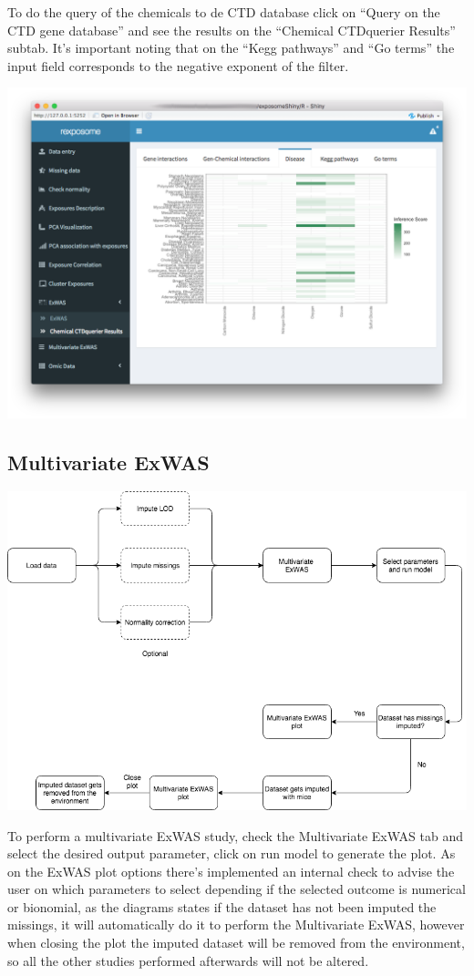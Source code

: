 \documentclass[
]{book}
\begin{document}
To do the query of the chemicals to de CTD database click on ``Query on the CTD gene database'' and see the results on the ``Chemical CTDquerier Results'' subtab. It's important noting that on the ``Kegg pathways'' and ``Go terms'' the input field corresponds to the negative exponent of the filter.

\includegraphics{images/analysis7_6.png}

\hypertarget{multivariate-exwas}{%
\subsection{Multivariate ExWAS}\label{multivariate-exwas}}

\includegraphics{images/analysis8_1.png}

To perform a multivariate ExWAS study, check the Multivariate ExWAS tab and select the desired output parameter, click on run model to generate the plot. As on the ExWAS plot options there's implemented an internal check to advise the user on which parameters to select depending if the selected outcome is numerical or bionomial, as the diagrams states if the dataset has not been imputed the missings, it will automatically do it to perform the Multivariate ExWAS, however when closing the plot the imputed dataset will be removed from the environment, so all the other studies performed afterwards will not be altered.
\end{document}
